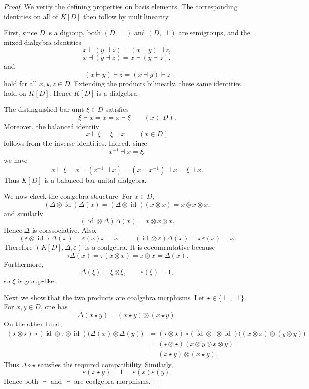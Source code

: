 \documentclass[11pt]{article}
\theoremstyle{plain}
\theoremstyle{definition}
\theoremstyle{remark}
\newcommand{\id}{\operatorname{id}}
\begin{document}
	\begin{proof}
		We verify the defining properties on basis elements. The corresponding
		identities on all of \(K[D]\) then follow by multilinearity.
		
		First, since \(D\) is a digroup, both \((D,\vdash)\) and \((D,\dashv)\)
		are semigroups, and the mixed dialgebra identities
		\[
		x\vdash (y\dashv z)=(x\vdash y)\dashv z,
		\]
		\[
		x\dashv (y\dashv z)=x\dashv (y\vdash z),
		\]
		and
		\[
		(x\vdash y)\vdash z=(x\dashv y)\vdash z
		\]
		hold for all \(x,y,z\in D\). Extending the products bilinearly, these same
		identities hold on \(K[D]\). Hence \(K[D]\) is a dialgebra.
		
		The distinguished bar-unit \(\xi\in D\) satisfies
		\[
		\xi\vdash x=x=x\dashv \xi
		\qquad
		(x\in D).
		\]
		Moreover, the balanced identity
		\[
		x\vdash \xi=\xi\dashv x
		\qquad
		(x\in D)
		\]
		follows from the inverse identities. Indeed, since
		\[
		x^{-1}\dashv x=\xi,
		\]
		we have
		\[
		x\vdash \xi
		=
		x\vdash (x^{-1}\dashv x)
		=
		(x\vdash x^{-1})\dashv x
		=
		\xi\dashv x.
		\]
		Thus \(K[D]\) is a balanced bar-unital dialgebra.
		
		We now check the coalgebra structure. For \(x\in D\),
		\[
		(\Delta\otimes \id)\Delta(x)
		=
		(\Delta\otimes \id)(x\otimes x)
		=
		x\otimes x\otimes x,
		\]
		and similarly
		\[
		(\id\otimes \Delta)\Delta(x)
		=
		x\otimes x\otimes x.
		\]
		Hence \(\Delta\) is coassociative. Also,
		\[
		(\varepsilon\otimes \id)\Delta(x)=\varepsilon(x)x=x,
		\qquad
		(\id\otimes \varepsilon)\Delta(x)=x\varepsilon(x)=x.
		\]
		Therefore \((K[D],\Delta,\varepsilon)\) is a coalgebra. It is
		cocommutative because
		\[
		\tau\Delta(x)=\tau(x\otimes x)=x\otimes x=\Delta(x).
		\]
		Furthermore,
		\[
		\Delta(\xi)=\xi\otimes\xi,
		\qquad
		\varepsilon(\xi)=1,
		\]
		so \(\xi\) is group-like.
		
		Next we show that the two products are coalgebra morphisms. Let
		\(\star\in\{\vdash,\dashv\}\). For \(x,y\in D\), one has
		\[
		\Delta(x\star y)
		=
		(x\star y)\otimes(x\star y).
		\]
		On the other hand,
		\begin{align*}
			(\star\otimes \star)
			\circ(\id\otimes\tau\otimes\id)
			\bigl(\Delta(x)\otimes\Delta(y)\bigr)
			&=
			(\star\otimes \star)
			\circ(\id\otimes\tau\otimes\id)
			\bigl((x\otimes x)\otimes(y\otimes y)\bigr)\\
			&=
			(\star\otimes \star)(x\otimes y\otimes x\otimes y)\\
			&=
			(x\star y)\otimes(x\star y).
		\end{align*}
		Thus \(\Delta\circ\star\) satisfies the required compatibility. Similarly,
		\[
		\varepsilon(x\star y)=1=\varepsilon(x)\varepsilon(y).
		\]
		Hence both \(\vdash\) and \(\dashv\) are coalgebra morphisms.
		

\end{proof}
\end{document}
